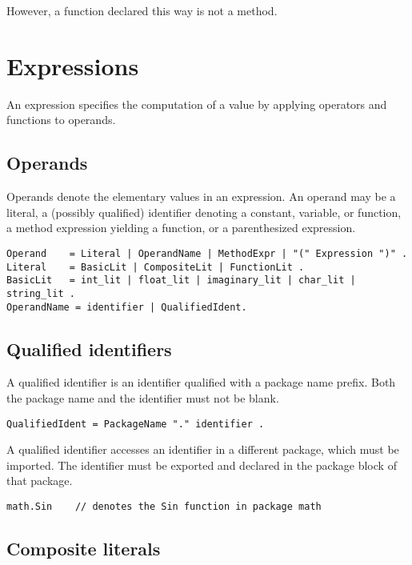 However, a function declared this way is not a method.

\section*{Expressions}

An expression specifies the computation of a value by applying operators
and functions to operands.

\subsection*{Operands}

Operands denote the elementary values in an expression. An operand may
be a literal, a (possibly qualified)
identifier denoting a constant,
variable, or
function, a
method expression yielding a function,
or a parenthesized expression.

\begin{Verbatim}[frame=single]
Operand    = Literal | OperandName | MethodExpr | "(" Expression ")" .
Literal    = BasicLit | CompositeLit | FunctionLit .
BasicLit   = int_lit | float_lit | imaginary_lit | char_lit | string_lit .
OperandName = identifier | QualifiedIdent.
\end{Verbatim}

\subsection*{Qualified identifiers}

A qualified identifier is an identifier qualified with a package name
prefix. Both the package name and the identifier must not be
blank.

\begin{Verbatim}[frame=single]
QualifiedIdent = PackageName "." identifier .
\end{Verbatim}

A qualified identifier accesses an identifier in a different package,
which must be imported. The identifier
must be exported and declared in the
package block of that package.

\begin{Verbatim}[frame=single]
math.Sin    // denotes the Sin function in package math
\end{Verbatim}

\subsection*{Composite literals}

